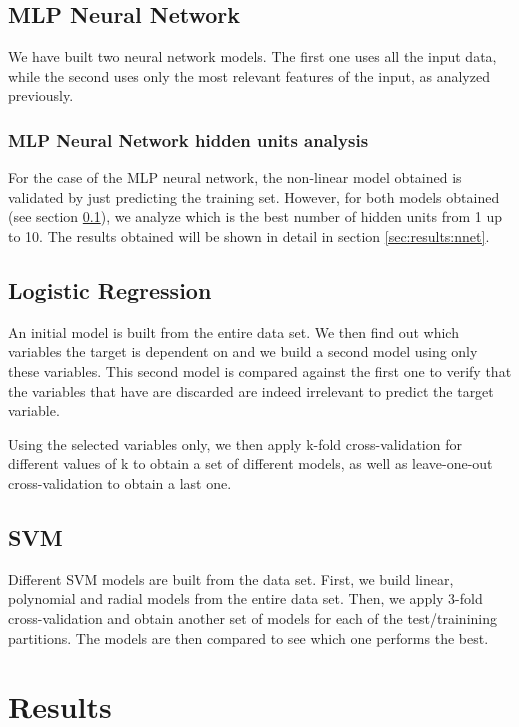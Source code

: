 \documentclass[english]{scrartcl}
\begin{document}
    \subsection{MLP Neural Network}
    \label{sec:methods:nnet}
    We have built two neural network models. The first one uses all the input data, while the second uses only the most
    relevant features of the input, as analyzed previously.
    
    \subsubsection{MLP Neural Network hidden units analysis}
    For the case of the MLP neural network, the non-linear model obtained is validated by just predicting the training set. However, for both models obtained
    (see section \ref{sec:methods:nnet}), we analyze which is the best number of hidden units from 1 up to 10. The results obtained will be shown in detail in
    section \ref{sec:results:nnet}.
    
    \subsection{Logistic Regression}
    An initial model is built from the entire data set. We then find out which variables the target is dependent on and we build a second model using only these variables. This second model is compared against the first one to verify that the variables that have are discarded are indeed irrelevant to predict the target variable.
    
    Using the selected variables only, we then apply k-fold cross-validation for different values of k to obtain a set of different models, as well as leave-one-out cross-validation to obtain a last one.
    
    \subsection{SVM}
    Different SVM models are built from the data set. First, we build linear, polynomial and radial models from the entire data set. Then, we apply 3-fold cross-validation and obtain another set of models for each of the test/trainining partitions. The models are then compared to see which one performs the best.

\section{Results}
\end{document}
